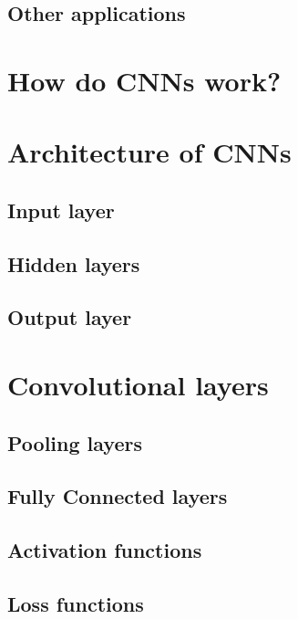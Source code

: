 \subsection{Other applications}

\section{How do CNNs work?}



\section{Architecture of CNNs}

\subsection{Input layer}
\subsection{Hidden layers}
\subsection{Output layer}



\section{Convolutional layers}

\subsection{Pooling layers}
\subsection{Fully Connected layers}
\subsection{Activation functions}
\subsection{Loss functions}